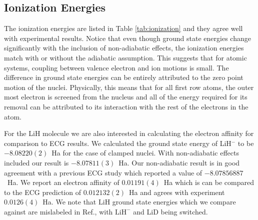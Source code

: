 \documentclass[pra,superscriptaddress,groupedaddress,twocolumn]{revtex4}
\begin{document}
\subsection{Ionization Energies}
The ionization energies are listed in Table \ref{tab:ionization} and they agree well with experimental results. Notice that even though ground state energies change significantly with the inclusion of non-adiabatic effects, the ionization energies match with or without the adiabatic assumption. This suggests that for atomic systems, coupling between valence electron and ion motions is small. The difference in ground state energies can be entirely attributed to the zero point motion of the nuclei. Physically, this means that for all first row atoms, the outer most electron is screened from the nucleus and all of the energy required for its removal can be attributed to its interaction with the rest of the electrons in the atom.

For the LiH molecule we are also interested in calculating the electron affinity for comparison to ECG results. We calculated the ground state energy of LiH$^-$ to be $-8.08220(2)$~Ha for the case of clamped nuclei.  With non-adiabatic effects included our result is  $-8.07811(3)$~Ha. Our non-adiabatic result is in good agreement with a previous ECG study \cite{Bubin_LiH_noBO} which reported a value of $-8.07856887$~Ha. We report an electron affinity of $0.01191(4)$~Ha which is can be compared to the ECG prediction of $0.012132(2)$~Ha and agrees with experiment $0.0126(4)$~Ha.  We note that $\text{LiH}$ ground state energies which we compare against are mislabeled in Ref.\cite{Bubin_LiH_noBO}, with $\text{LiH}^-$ and LiD being switched.%


 
\end{document}
